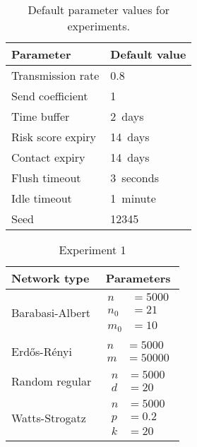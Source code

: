 \begin{table}[htbp]
  \centering
  \begin{tabular}{ll}
    \toprule
    Parameter & Default value \\
    \midrule
    Transmission rate & \num{0.8}\\
    Send coefficient & \num{1}\\
    Time buffer & \qty{2}{days}\\
    Risk score expiry & \qty{14}{days}\\
    Contact expiry & \qty{14}{days}\\
    Flush timeout & \qty{3}{seconds}\\
    Idle timeout & \qty{1}{minute}\\
    Seed & \num{12345}\\
    \bottomrule
  \end{tabular}
  \caption[Default parameter values for experiments]{Default parameter values for experiments.}
  \label{tab:default-parameters}
\end{table}

\begin{table}[htbp]
  \centering
  \begin{tabular}{lc}
    \toprule
    Network type & Parameters \\
    \midrule
    Barabasi-Albert & $\begin{aligned} n &= \num{5000} \\ n_0 &= \num{21} \\ m_0 &= \num{10} \end{aligned}$\\
    \midrule
    Erd\H{o}s-R\'{e}nyi & $\begin{aligned} n &= \num{5000} \\ m &= \num{50000} \end{aligned}$\\
    \midrule
    Random regular & $\begin{aligned} n &= \num{5000} \\ d &= 20 \end{aligned}$\\
    \midrule
    Watts-Strogatz & $\begin{aligned} n &= \num{5000} \\ p &= \num{0.2} \\ k &= \num{20} \end{aligned}$\\
    \bottomrule
  \end{tabular}
  \caption[]{Experiment 1}
  \label{tab:network-parameters}
\end{table}

